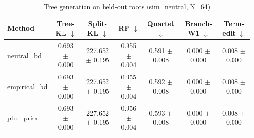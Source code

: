 \begin{table}[t]\centering
\caption{Tree generation on held-out roots (sim_neutral, N=64)}
\begin{tabular}{lcccccc}
\toprule
Method & Tree-KL $\downarrow$ & Split-KL $\downarrow$ & RF $\downarrow$ & Quartet $\downarrow$ & Branch-W1 $\downarrow$ & Term-edit $\downarrow$ \\
\midrule
neutral\_bd & 0.693 $\pm$ 0.000 & 227.652 $\pm$ 0.195 & 0.955 $\pm$ 0.004 & 0.591 $\pm$ 0.008 & 0.000 $\pm$ 0.000 & 0.008 $\pm$ 0.000 \\
empirical\_bd & 0.693 $\pm$ 0.000 & 227.652 $\pm$ 0.195 & 0.955 $\pm$ 0.004 & 0.592 $\pm$ 0.008 & 0.000 $\pm$ 0.000 & 0.008 $\pm$ 0.000 \\
plm\_prior & 0.693 $\pm$ 0.000 & 227.652 $\pm$ 0.195 & 0.956 $\pm$ 0.004 & 0.593 $\pm$ 0.008 & 0.000 $\pm$ 0.000 & 0.008 $\pm$ 0.000 \\
\bottomrule
\end{tabular}
\end{table}
